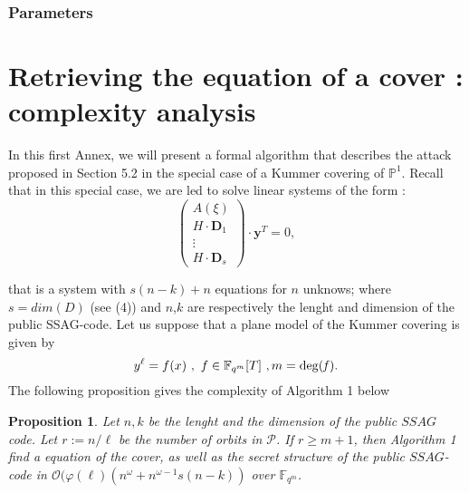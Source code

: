 \documentclass[10pt]{article}
\newtheorem{prop1}{Proposition}[]
\newcommand{\s}{\vspace{0.3cm}}
\newcommand{\cd}{\cdot}
\newcommand{\calO}{\mathcal{O}}
\newcommand{\fqm}{\mathbb{F}_{q^m}}
\newcommand{\w}{\omega}
\newcommand{\PR}{\mathcal{P}}
\begin{document}
\s \color{red} \subsubsection{Parameters} \color{black}

\newpage

\appendix

\section{Retrieving the equation of a cover : complexity analysis}

\s

In this first Annex, we will present a formal algorithm that describes the attack proposed in Section 5.2 in the special case of a Kummer covering of $\mathbb{P}^1$. Recall that in this special case, we are led to solve linear systems of the form :
\begin{equation} \tag{$\Delta(\xi)$}
\begin{pmatrix}
A(\xi) \\
H \cd \textbf{D}_1 \\
\vdots \\
H \cd \textbf{D}_s
\end{pmatrix}
\cd \textbf{y}^T = 0,
\end{equation}
\s

that is a system with $s(n-k)+n$ equations for $n$ unknows; where $s=dim(D)$ (see (4)) and $n$,$k$ are respectively the lenght and dimension of the public SSAG-code. Let us suppose that a plane model of the Kummer covering is given by 
\[y^{\ell} = f(x) \ , \ f \in \fqm[T] \ , m=\rm{deg}(\it f).\]
The following proposition gives the complexity of Algorithm 1 below

\s

\begin{prop1} Let $n,k$ be the lenght and the dimension of the public $SSAG$ code. Let $r := n/\ell$ be the number of orbits in $\PR$. If $r \geq m+1$, then Algorithm 1 find a equation of the cover, as well as the secret structure of the public $SSAG$-code in $\calO(\varphi(\ell)(n^{\w}+n^{\w-1}s(n-k))$ over $\fqm$. 

\end{prop1}

\s
\end{document}

